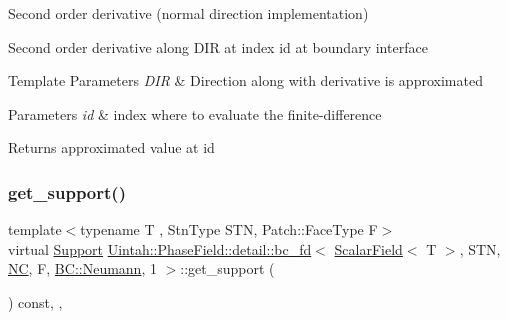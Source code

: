 Second order derivative (normal direction implementation) 

Second order derivative along D\+IR at index id at boundary interface


\begin{DoxyTemplParams}{Template Parameters}
{\em D\+IR} & Direction along with derivative is approximated \\
\hline
\end{DoxyTemplParams}

\begin{DoxyParams}{Parameters}
{\em id} & index where to evaluate the finite-\/difference \\
\hline
\end{DoxyParams}
\begin{DoxyReturn}{Returns}
approximated value at id 
\end{DoxyReturn}
\mbox{\label{classUintah_1_1PhaseField_1_1detail_1_1bc__fd_3_01ScalarField_3_01T_01_4_00_01STN_00_01NC_00_01F_00_01BC_1_1Neumann_00_011_01_4_aa7eefccb50d6481f68875de64daaf45b}} 
\subsubsection{\texorpdfstring{get\+\_\+support()}{get\_support()}}
{\footnotesize\ttfamily template$<$typename T , Stn\+Type S\+TN, Patch\+::\+Face\+Type F$>$ \\
virtual \hyperlink{classUintah_1_1PhaseField_1_1Support}{Support} \hyperlink{classUintah_1_1PhaseField_1_1detail_1_1bc__fd}{Uintah\+::\+Phase\+Field\+::detail\+::bc\+\_\+fd}$<$ \hyperlink{structUintah_1_1PhaseField_1_1ScalarField}{Scalar\+Field}$<$ T $>$, S\+TN, \hyperlink{namespaceUintah_1_1PhaseField_a33d355affda78a83f45755ba8388cedda77924170fe82bfd58b74ca3e44139718}{NC}, F, \hyperlink{namespaceUintah_1_1PhaseField_a148fba372aa3be96fd6eede7a2fa10b5ab8537a769dbc90cb1762215441212152}{B\+C\+::\+Neumann}, 1 $>$\+::get\+\_\+support (\begin{DoxyParamCaption}{ }\end{DoxyParamCaption}) const\hspace{0.3cm}{\ttfamily [inline]}, {\ttfamily [override]}, {\ttfamily [virtual]}}



